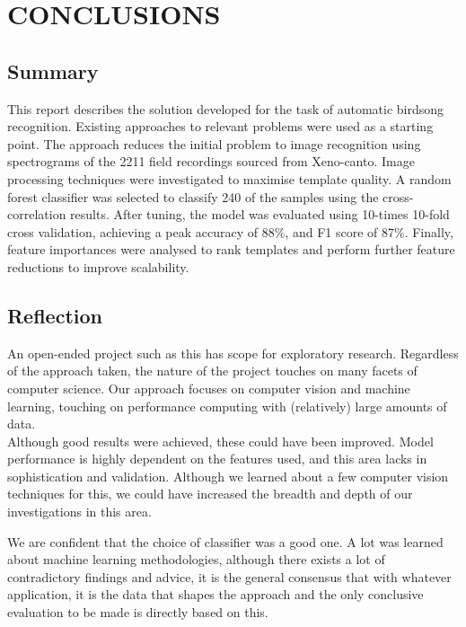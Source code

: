 \chapter{CONCLUSIONS}

%
%

\section{Summary}
This report describes the solution developed for the task of automatic birdsong
recognition.
Existing approaches to relevant problems were used as a starting point.
The approach reduces the initial problem to image recognition using spectrograms
of the 2211 field recordings sourced from Xeno-canto.
Image processing techniques were investigated to maximise template quality.
A random forest classifier was selected to classify 240 of the samples using the
cross-correlation results.
After tuning, the model was evaluated using 10-times 10-fold cross validation, 
achieving a peak accuracy of 88\%, and F1 score of 87\%.
Finally, feature importances were analysed to rank templates and perform further
feature reductions to improve scalability.

\section{Reflection}
An open-ended project such as this has scope for exploratory research.
Regardless of the approach taken, the nature of the project touches on many
facets of computer science.
Our approach focuses on computer vision and machine learning, touching on
performance computing with (relatively) large amounts of data.\\

Although good results were achieved, these could have been improved.
Model performance is highly dependent on the features used, and this area
lacks in sophistication and validation.
Although we learned about a few computer vision techniques for this, we could
have increased the breadth and depth of our investigations in this area.

We are confident that the choice of classifier was a good one.
A lot was learned about machine learning methodologies, although there exists
a lot of contradictory findings and advice, it is the general consensus that
with whatever application, it is the data that shapes the approach and the only
conclusive evaluation to be made is directly based on this.

